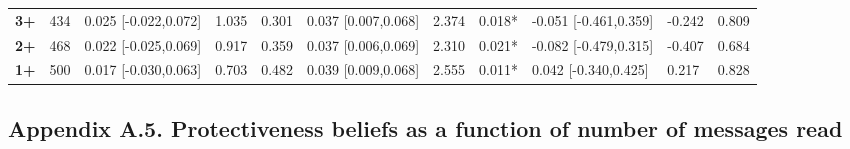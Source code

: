 \documentclass[authordate, empirical]{jote-new-article}
\begin{document}
\begin{table}[h!]
\begin{fullwidth}
{\begin{tabular}{@{} l l l l l l l l l l l @{}}
        \textbf{3+}                                       & 434        & 0.025 [-0.022,0.072]                            & 1.035                 & 0.301    & 0.037 [0.007,0.068]
                                                          & 2.374      & 0.018*                                          & -0.051 [-0.461,0.359] & -0.242   & 0.809                                \\

        \textbf{2+}                                       & 468        & 0.022 [-0.025,0.069]                            & 0.917                 & 0.359    & 0.037 [0.006,0.069]
                                                          & 2.310      & 0.021*                                          & -0.082 [-0.479,0.315] & -0.407   & 0.684                                \\

        \textbf{1+}                                       & 500        & 0.017 [-0.030,0.063]                            & 0.703                 & 0.482    & 0.039 [0.009,0.068]
                                                          & 2.555      & 0.011*                                          & 0.042 [-0.340,0.425]  & 0.217    & 0.828                                \\
      \end{tabular}}
  \end{fullwidth}
\end{table}

\subsection{Appendix A.5. Protectiveness beliefs as a function of number of messages read}
\end{document}

